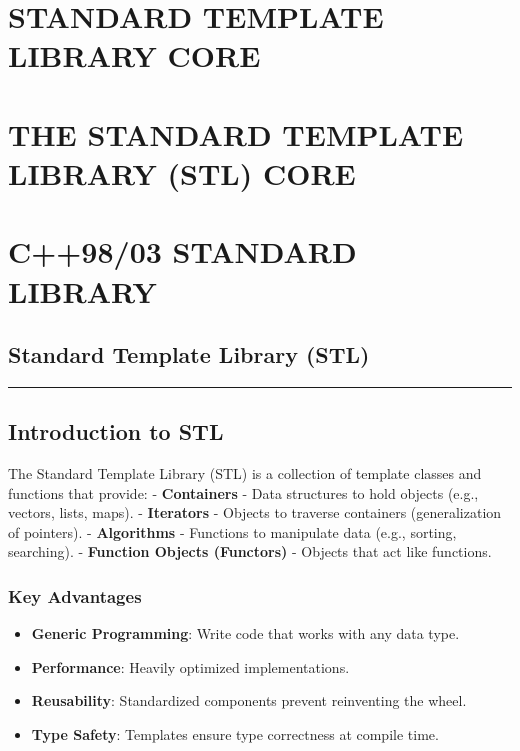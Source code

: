 \hypertarget{standard-template-library-core}{%
\chapter{STANDARD TEMPLATE LIBRARY
CORE}\label{standard-template-library-core}}

\hypertarget{the-standard-template-library-stl-core}{%
\chapter{THE STANDARD TEMPLATE LIBRARY (STL)
CORE}\label{the-standard-template-library-stl-core}}

\hypertarget{c9803-standard-library}{%
\chapter{C++98/03 STANDARD LIBRARY}\label{c9803-standard-library}}

\hypertarget{standard-template-library-stl}{%
\section{Standard Template Library
(STL)}\label{standard-template-library-stl}}

\begin{center}\rule{0.5\linewidth}{0.5pt}\end{center}

\hypertarget{introduction-to-stl}{%
\section{Introduction to STL}\label{introduction-to-stl}}

The Standard Template Library (STL) is a collection of template classes
and functions that provide: - \textbf{Containers} - Data structures to
hold objects (e.g., vectors, lists, maps). - \textbf{Iterators} -
Objects to traverse containers (generalization of pointers). -
\textbf{Algorithms} - Functions to manipulate data (e.g., sorting,
searching). - \textbf{Function Objects (Functors)} - Objects that act
like functions.

\hypertarget{key-advantages}{%
\subsection{Key Advantages}\label{key-advantages}}

\begin{itemize}
\tightlist
\item
  \textbf{Generic Programming}: Write code that works with any data
  type.
\item
  \textbf{Performance}: Heavily optimized implementations.
\item
  \textbf{Reusability}: Standardized components prevent reinventing the
  wheel.
\item
  \textbf{Type Safety}: Templates ensure type correctness at compile
  time.
\end{itemize}

